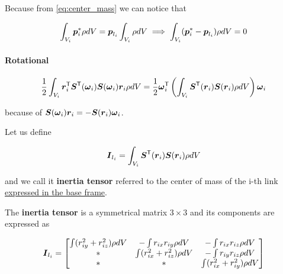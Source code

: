 Because from \autoref{eq:center_mass} we can notice that

\[
	\int_{V_i} \boldsymbol{p}_i^* \rho dV = \boldsymbol{p}_{l_i} \int_{V_i} \rho dV
	\implies
	\int_{V_i} (\boldsymbol{p}_i^* - \boldsymbol{p}_{l_i}) \rho dV = 0
\]

\paragraph{Rotational}

\[
	\frac{1}{2} \int_{V_i} \boldsymbol{r}_i^{\mathsf{T}} \boldsymbol{S}^{\mathsf{T}}(\boldsymbol{\omega}_i) \boldsymbol{S}(\boldsymbol{\omega}_i) \boldsymbol{r}_i \rho dV =
	\frac{1}{2} \boldsymbol{\omega}_i^{\mathsf{T}} \left( \int_{V_i} \boldsymbol{S}^{\mathsf{T}}(\boldsymbol{r}_i) \boldsymbol{S}(\boldsymbol{r}_i) \rho dV \right) \boldsymbol{\omega}_i
\]

because of $\boldsymbol{S}(\boldsymbol{\omega}_i) \boldsymbol{r}_i = - \boldsymbol{S}(\boldsymbol{r}_i)\boldsymbol{\omega}_i$.

Let us define

\[ \boldsymbol{I}_{l_i} = \int_{V_i} \boldsymbol{S}^{\mathsf{T}}(\boldsymbol{r}_i) \boldsymbol{S}(\boldsymbol{r}_i) \rho dV \]

and we call it \textbf{inertia tensor} referred to the center of mass of the i-th link \underline{expressed in the base frame}.

The \textbf{inertia tensor} is a symmetrical matrix $3 \times 3$ and its components are expressed as

\[
	\boldsymbol{I}_{l_i} =
	\begin{bmatrix}
		\int (r_{iy}^2 + r_{iz}^2) \rho dV & - \int r_{ix}r_{iy} \rho dV & - \int r_{ix}r_{iz} \rho dV \\
		* & \int (r_{ix}^2 + r_{iz}^2) \rho dV & - \int r_{iy}r_{iz} \rho dV \\
		* & * & \int (r_{ix}^2 + r_{iy}^2) \rho dV
	\end{bmatrix}
\]
